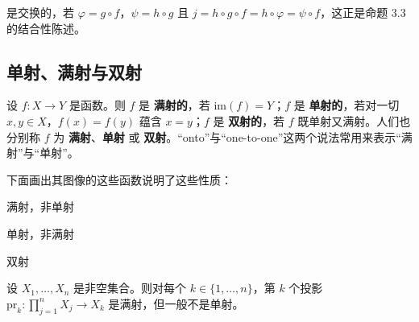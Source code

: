 
是交换的，若 $ \varphi = g \circ f $，$ \psi = h \circ g $ 且 $ j = h \circ g \circ f = h \circ \varphi = \psi \circ f $，这正是命题 3.3 的结合性陈述。

\subsection*{单射、满射与双射}

设 $f: X \to Y$ 是函数。则 $f$ 是 \textbf{满射的}，若 $\mathrm{im}(f) = Y$；$f$ 是 \textbf{单射的}，若对一切 $x, y \in X$，$f(x) = f(y)$ 蕴含 $x = y$；$f$ 是 \textbf{双射的}，若 $f$ 既单射又满射。人们也分别称 $f$ 为 \textbf{满射}、\textbf{单射} 或 \textbf{双射}。“onto”与“one-to-one”这两个说法常用来表示“满射”与“单射”。

\begin{example}

\begin{items}
\item

下面画出其图像的这些函数说明了这些性质：

\end{items}


满射，非单射


单射，非满射


双射

\begin{items}
\item[（b）]

设 $ X_1, \ldots, X_n $ 是非空集合。则对每个 $ k \in \{1, \ldots, n\} $，第 $ k $ 个投影 $ \text{pr}_k: \prod_{j=1}^n X_j \to X_k $ 是满射，但一般不是单射。

\end{items}

\end{example}


